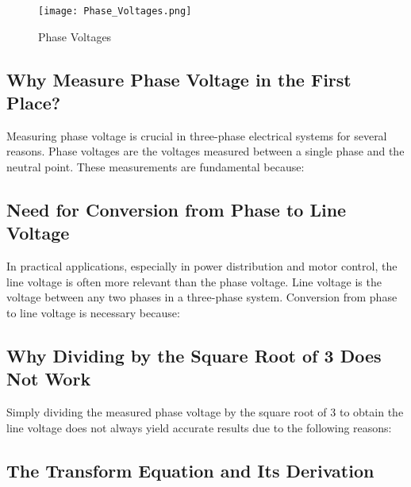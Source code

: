 \begin{figure}[h]
    \centering
    \texttt{[image: Phase\_Voltages.png]}
    \caption{Phase Voltages}
    \label{fig:Phase Voltages}
\end{figure}
\subsection{Why Measure Phase Voltage in the First Place?}

Measuring phase voltage is crucial in three-phase electrical systems for
several reasons. Phase voltages are the voltages measured between a single
phase and the neutral point. These measurements are fundamental because:

\subsection{Need for Conversion from Phase to Line Voltage}

In practical applications, especially in power distribution and motor control,
the line voltage is often more relevant than the phase voltage. Line voltage is
the voltage between any two phases in a three-phase system. Conversion from
phase to line voltage is necessary because:

\subsection{Why Dividing by the Square Root of 3 Does Not Work}

Simply dividing the measured phase voltage by the square root of 3 to obtain
the line voltage does not always yield accurate results due to the following
reasons:

\subsection{The Transform Equation and Its Derivation}